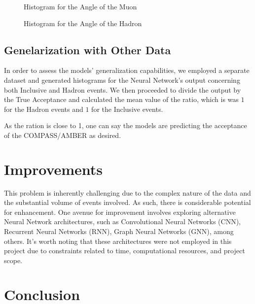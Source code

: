 \documentclass{article}
\begin{document}
\begin{figure}[H]
    \centering
    \caption{Histogram for the Angle of the Muon}
    \label{fig:muon_angle}
\end{figure}

\begin{figure}[H]
    \centering
    \caption{Histogram for the Angle of the Hadron}
    \label{fig:hadron_angle}
\end{figure}

\subsection{Genelarization with Other Data}
In order to assess the models' generalization capabilities, we employed a separate dataset and generated histograms for the Neural Network's output concerning both Inclusive and Hadron events.
We then proceeded to divide the output by the True Acceptance and calculated the mean value of the ratio, which is was $1$ for the Hadron events and $1$ for the Inclusive events.

As the ration is close to 1, one can say the models are predicting the acceptance of the COMPASS/AMBER as desired.

\section{Improvements}
This problem is inherently challenging due to the complex nature of the data and the substantial volume of events involved. As such, there is considerable potential for enhancement. One avenue for improvement involves exploring alternative Neural Network architectures, such as Convolutional Neural Networks (CNN), Recurrent Neural Networks (RNN), Graph Neural Networks (GNN), among others. It's worth noting that these architectures were not employed in this project due to constraints related to time, computational resources, and project scope.


\section{Conclusion}
\end{document}
